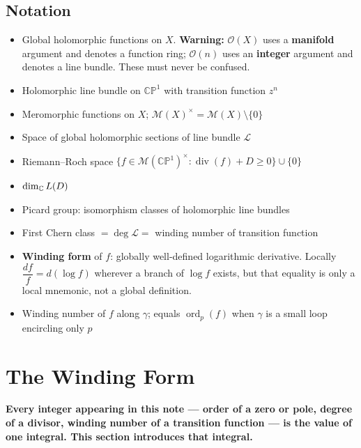 \documentclass[11pt,openany]{article}
\renewcommand{\emph}[1]{\textbf{#1}}
\newcommand{\CP}{\mathbb{CP}}
\newcommand{\CPone}{\CP^1}
\newcommand{\OO}{\mathcal{O}}
\newcommand{\MM}{\mathcal{M}}
\newcommand{\Pic}{\operatorname{Pic}}
\newcommand{\ord}{\operatorname{ord}}
\renewcommand{\div}{\operatorname{div}}
\begin{document}
\subsection*{Notation}
\begin{itemize}
  \item[$\OO(X)$] Global holomorphic functions on $X$.
    \quad\textbf{Warning:} $\OO(X)$ uses a \emph{manifold} argument and denotes a
    function ring; $\OO(n)$ uses an \emph{integer} argument and denotes a line bundle.
    These must never be confused.
  \item[$\OO(n)$] Holomorphic line bundle on $\CPone$ with transition function $z^n$
  \item[$\MM(X)$] Meromorphic functions on $X$; $\MM(X)^\times = \MM(X)\setminus\{0\}$
  \item[$H^0(X,\mathcal{L})$] Space of global holomorphic sections of line bundle $\mathcal{L}$
  \item[$L(D)$] Riemann--Roch space $\{f\in\MM(\CPone)^\times:\div(f)+D\ge0\}\cup\{0\}$
  \item[$\ell(D)$] $\dim_{\mathbb{C}} L(D)$
  \item[$\Pic(X)$] Picard group: isomorphism classes of holomorphic line bundles
  \item[$c_1(\mathcal{L})$] First Chern class $= \deg\mathcal{L} =$ winding number of transition function
  \item[$\dfrac{df}{f}$]
    \textbf{Winding form} of $f$: globally well-defined logarithmic derivative.
    Locally $\dfrac{df}{f}=d(\log f)$ wherever a branch of $\log f$ exists,
    but that equality is only a local mnemonic, not a global definition.
  \item[$\dfrac{1}{2\pi i}\oint_\gamma\dfrac{df}{f}$]
    Winding number of $f$ along $\gamma$;
    equals $\ord_p(f)$ when $\gamma$ is a small loop encircling only $p$
\end{itemize}

\newpage
\section{The Winding Form}
\label{sec:winding}

\medskip\noindent
\emph{Every integer appearing in this note — order of a zero or pole, degree of a
divisor, winding number of a transition function — is the value of one integral.
This section introduces that integral.}
\end{document}
